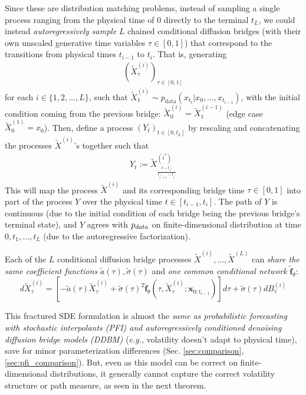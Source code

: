 \documentclass{article}
\newcommand{\pdata}{p_{\normalfont{data}}}
\begin{document}
Since these are distribution matching problems, instead of sampling a single process ranging from the physical time of $0$ directly to the terminal $t_L$, we could instead \textit{autoregressively sample} $L$ chained conditional diffusion bridges (with their own unscaled generative time variables $\tau \in [0, 1]$) that correspond to the transitions from physical times $t_{i-1}$ to $t_{i}$.
That is, generating
\begin{align}
    \left(\tilde{X}^{(i)}_\tau\right)_{\tau \in [0,1]}
\end{align}
for each $i \in \{1,2,\dots,L\}$, such that $\tilde{X}^{(i)}_1 \sim p_\text{data}(x_{t_{i}} | x_{0}, \ldots, x_{t_{i-1}})$, with the initial condition coming from the previous bridge: $\tilde{X}^{(i)}_0 = \tilde{X}^{(i-1)}_1$ (edge case $\tilde{X}^{(1)}_0 = x_0$).
Then, define a process $(Y_t)_{t\in [0,t_L]}$ by rescaling and concatenating the processes $\tilde{X}^{(i)}$'s together such that
\begin{align}
\label{eqn:time_shifted_bridge}
    Y_t := \tilde{X}^{(i^*)}_{\frac{t-t_{i^*}}{t_{i^*+1}-t_{i^*}}}
\end{align}
This will map the process $\tilde{X}^{(i)}$ and its corresponding bridge time $\tau \in [0,1]$ into part of the process $Y$ over the physical time $t \in [t_{i-1}, t_i]$.
The path of $Y$ is continuous (due to the initial condition of each bridge being the previous bridge's terminal state), and $Y$ agrees with $\pdata$ on finite-dimensional distribution at time $0, t_1, \dots, t_L$ (due to the autoregressive factorization).

Each of the $L$ conditional diffusion bridge processes $\tilde{X}^{(i)}, \ldots, \tilde{X}^{(L)}$ can \textit{share the same coefficient functions} $\tilde{a}(\tau), \tilde{\sigma}(\tau)$ and \textit{one common conditional network} $\tilde{\mathbf{f}}_\theta$:
\begin{equation}\label{eqn:cond_diffusion_bridge}
    d\tilde{X}^{(i)}_{\tau} = \left[-\tilde{a}(\tau)\tilde{X}^{(i)}_{\tau} + \tilde{\sigma}(\tau)^2\tilde{\mathbf{f}}_\theta\left(\tau, \tilde{X}^{(i)}_{\tau}; \mathbf{x}_{0:t_{i-1}}\right)\right]d\tau + \tilde{\sigma}(\tau)dB^{(i)}_{\tau}
\end{equation}


This fractured SDE formulation is almost the \textit{same as probabilistic forecasting with stochastic interpolants (PFI) \cite{chen2024probabilistic} and autoregressively conditioned denoising diffusion bridge models (DDBM) \cite{zhou2023denoising}} (\textit{e.g.}, volatility doesn't adapt to physical time), save for minor parameterization differences (Sec. \ref{sec:comparison}, \ref{sec:pfi_comparison}).
But, even as this model can be correct on finite-dimensional distributions, it generally cannot capture the correct volatility structure or path measure, as seen in the next theorem.
\end{document}
